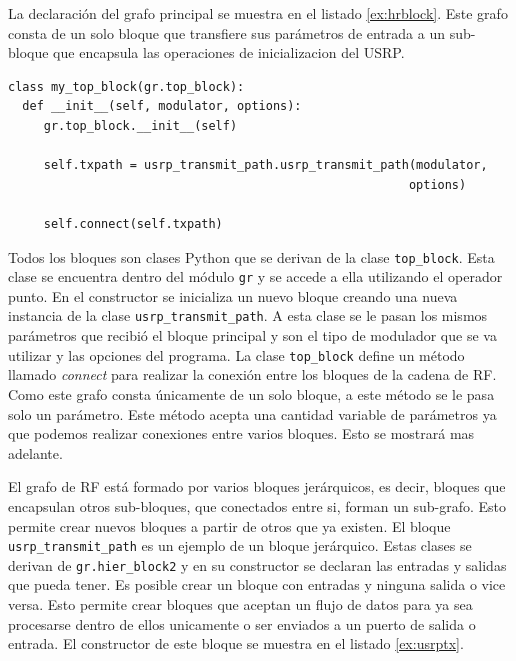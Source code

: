 La declaraci\'on del grafo principal se muestra en el listado \ref{ex:hrblock}. Este grafo consta de
un solo bloque que transfiere sus par\'ametros de entrada a un sub-bloque que encapsula las
operaciones de inicializacion del USRP.
 
\begin{lstlisting}[float,frame=single,label=ex:hrblock,caption={Declaraci\'on del bloque
jer\'arquico principal.}]
class my_top_block(gr.top_block):
  def __init__(self, modulator, options):
     gr.top_block.__init__(self)

     self.txpath = usrp_transmit_path.usrp_transmit_path(modulator, 
                                                        options)

     self.connect(self.txpath)
\end{lstlisting}

Todos los bloques son clases Python que se derivan de la clase \verb|top_block|. Esta clase se
encuentra dentro del m\'odulo \verb|gr| y se accede a ella utilizando el operador punto. En el
constructor se inicializa un nuevo bloque creando una nueva instancia de la clase
\verb|usrp_transmit_path|. A esta clase se le pasan los mismos par\'ametros que recibi\'o el bloque
principal y son el tipo de modulador que se va utilizar y las opciones del programa. La clase
\verb|top_block| define un m\'etodo llamado \emph{connect} para realizar la conexi\'on entre los
bloques de la cadena de RF. Como este grafo consta \'unicamente de un solo bloque, a este m\'etodo
se le pasa solo un par\'ametro. Este m\'etodo acepta una cantidad variable de par\'ametros ya que
podemos realizar conexiones entre varios bloques. Esto se mostrar\'a mas adelante.

El grafo de RF est\'a formado por varios bloques jer\'arquicos, es decir, bloques que encapsulan
otros sub-bloques, que conectados entre si, forman un sub-grafo. Esto permite crear nuevos bloques a
partir de otros que ya existen. El bloque \verb|usrp_transmit_path| es un ejemplo de un bloque
jer\'arquico. Estas clases se derivan de \verb|gr.hier_block2| y en su constructor se declaran las
entradas y salidas que pueda tener. Es posible crear un bloque con entradas y ninguna salida o vice
versa. Esto permite crear bloques que aceptan un flujo de datos para ya sea procesarse dentro de
ellos unicamente o ser enviados a un puerto de salida o entrada. El constructor de este bloque se
muestra en el listado \ref{ex:usrptx}.

